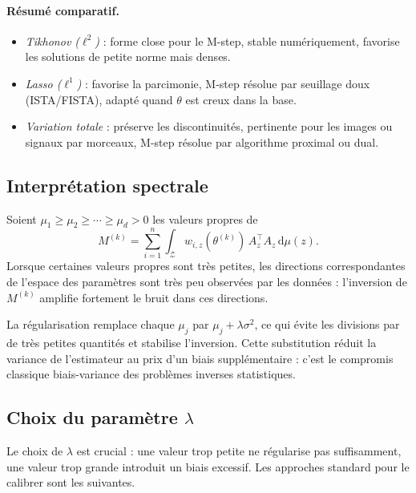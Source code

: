 \documentclass[12pt, a4paper]{article}
\theoremstyle{definition}
\newcommand{\Zcal}{\mathcal{Z}}
\begin{document}
\paragraph{Résumé comparatif.}
\begin{itemize}
  \item \textit{Tikhonov ($\ell^2$)} : forme close pour le M-step, stable
    numériquement, favorise les solutions de petite norme mais denses.
  \item \textit{Lasso ($\ell^1$)} : favorise la parcimonie, M-step résolue par
    seuillage doux (ISTA/FISTA), adapté quand $\theta$ est creux dans la base.
  \item \textit{Variation totale} : préserve les discontinuités, pertinente pour les
    images ou signaux par morceaux, M-step résolue par algorithme proximal ou dual.
\end{itemize}

\subsection{Interprétation spectrale}
\label{subsec:interp_spectrale}

Soient $\mu_1 \geq \mu_2 \geq \cdots \geq \mu_d > 0$ les valeurs propres de
\[
M^{(k)}
=
\sum_{i=1}^n \int_{\Zcal} w_{i,z}(\theta^{(k)})\, A_z^\top A_z \,\mathrm{d}\mu(z).
\]
Lorsque certaines valeurs propres sont très petites, les directions correspondantes
de l’espace des paramètres sont très peu observées par les données : l’inversion de
$M^{(k)}$ amplifie fortement le bruit dans ces directions.

La régularisation remplace chaque $\mu_j$ par $\mu_j + \lambda\sigma^2$,
ce qui évite les divisions par de très petites quantités et stabilise l’inversion.
Cette substitution réduit la variance de l’estimateur au prix d’un biais supplémentaire :
c’est le compromis classique biais-variance des problèmes inverses statistiques.

\subsection{Choix du paramètre \texorpdfstring{$\lambda$}{lambda}}
\label{subsec:choix_lambda}

Le choix de $\lambda$ est crucial : une valeur trop petite ne régularise pas
suffisamment, une valeur trop grande introduit un biais excessif. Les approches
standard pour le calibrer sont les suivantes.
\end{document}
